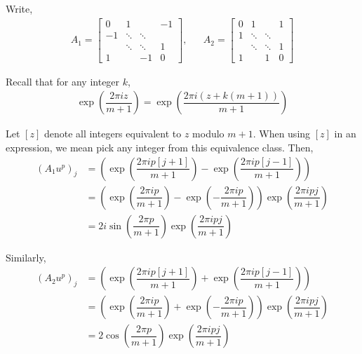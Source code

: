 \documentclass[10pt]{article}
\begin{document}
\begin{solution}[Solution]

Write,
\begin{align*}
    A_1 = \left[ \begin{array}{cccc}
    0 & 1 &  & -1 \\
    -1 & \ddots & \ddots & \\
       & \ddots & \ddots & 1 \\
    1  &  & -1  & 0 \end{array} \right]
    ,&&
    A_2 = \left[ \begin{array}{cccc}
    0 & 1 &  & 1 \\
    1 & \ddots & \ddots & \\
       & \ddots & \ddots & 1 \\
    1  &  & 1  & 0 \end{array} \right]
\end{align*}

Recall that for any integer \( k \),
\begin{align*}
    \exp\left(\dfrac{2\pi i z}{m+1}\right) = \exp\left(\dfrac{2\pi i (z+k(m+1))}{m+1}\right)
\end{align*}

Let \( [z] \) denote all integers equivalent to \( z \) modulo \( m+1 \). When using \( [z] \) in an expression, we mean pick any integer from this equivalence class.
Then,
\begin{align*}
    (A_1 u^p)_{j} %
    &= \left( \exp \left( \dfrac{2\pi i p [j+1]}{m+1} \right) - \exp \left( \dfrac{2\pi i p [j-1]}{m+1} \right) \right) \\
    &= \left( \exp \left( \dfrac{2\pi i p}{m+1} \right)- \exp \left(-\dfrac{2\pi i p}{m+1} \right)  \right) \exp \left( \dfrac{2\pi i p j}{m+1} \right) \\
    &= 2i\sin \left( \dfrac{2\pi p}{m+1} \right) \exp \left( \dfrac{2\pi i p j}{m+1} \right)
\end{align*}

Similarly,
\begin{align*}
    (A_2 u^p)_{j} %
    &= \left( \exp \left( \dfrac{2\pi i p [j+1]}{m+1} \right) + \exp \left( \dfrac{2\pi i p [j-1]}{m+1} \right) \right) \\
    &= \left( \exp \left( \dfrac{2\pi i p}{m+1}\right) + \exp \left(-\dfrac{2\pi i p}{m+1} \right) \right) \exp \left( \dfrac{2\pi i p j}{m+1} \right) \\
    &= 2 \cos \left( \dfrac{2\pi p}{m+1} \right) \exp \left( \dfrac{2\pi i p j}{m+1} \right)
\end{align*}


\end{solution}
\end{document}
